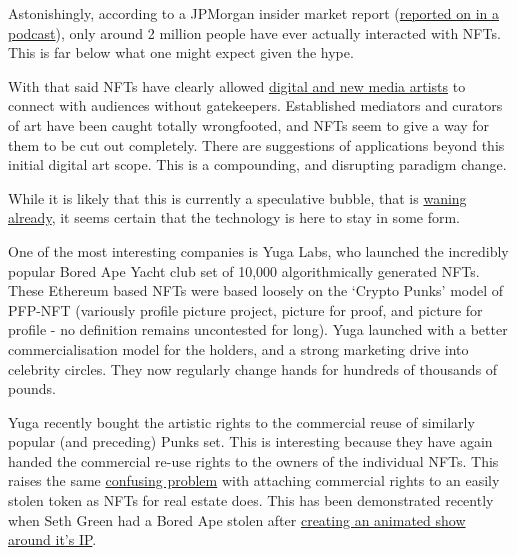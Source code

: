 Astonishingly, according to a JPMorgan insider market report (\href{https://www.coindesk.com/podcasts/the-breakdown-with-nlw/jpmorgan-bitcoin-shows-some-merit-as-a-store-of-value/}{reported on in a podcast}), only around 2 million people have ever actually interacted with NFTs. This is far below what one might expect given the hype.\par
With that said NFTs have clearly allowed \href{https://en.wikipedia.org/wiki/List_of_most_expensive_non-fungible_tokens}{digital and new media artists} to connect with audiences without gatekeepers. Established mediators and curators of art have been caught totally wrongfooted, and NFTs seem to give a way for them to be cut out completely. There are suggestions of applications beyond this initial digital art scope. This is a compounding, and disrupting paradigm change.\par
While it is likely that this is currently a speculative bubble, that is \href{https://www.bbc.co.uk/news/business-61102759}{waning already}, it seems certain that the technology is here to stay in some form.\par
One of the most interesting companies is Yuga Labs, who launched the incredibly popular Bored Ape Yacht club set of 10,000 algorithmically generated NFTs. These Ethereum based NFTs were based loosely on the `Crypto Punks' model of PFP-NFT (variously profile picture project, picture for proof, and picture for profile - no definition remains uncontested for long). Yuga launched with a better commercialisation model for the holders, and a strong marketing drive into celebrity circles. They now regularly change hands for hundreds of thousands of pounds.\par
Yuga recently bought the artistic rights to the commercial reuse of similarly popular (and preceding) Punks set. This is interesting because they have again handed the commercial re-use rights to the owners of the individual NFTs. This raises the same \href{https://www.bloomberg.com/news/articles/2022-03-21/bored-ape-nft-spinoff-venture-gone-sour-sparks-legal-fight}{confusing problem} with attaching commercial rights to an easily stolen token as NFTs for real estate does. This has been demonstrated recently when Seth Green had a Bored Ape stolen after \href{https://www.buzzfeednews.com/article/sarahemerson/seth-green-bored-ape-stolen-tv-show}{creating an animated show around it's IP}.  \par

